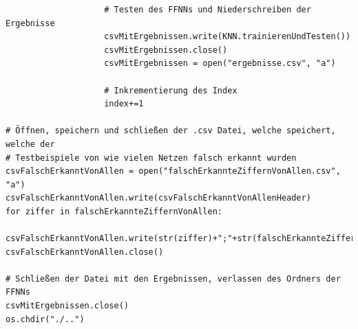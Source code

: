 \documentclass[a4paper,12pt,ngerman,oneside]{scrreprt}	%
\begin{document}
{\begin{lstlisting}
					# Testen des FFNNs und Niederschreiben der Ergebnisse
					csvMitErgebnissen.write(KNN.trainierenUndTesten())
					csvMitErgebnissen.close()
					csvMitErgebnissen = open("ergebnisse.csv", "a")
					
					# Inkrementierung des Index
					index+=1

# Öffnen, speichern und schließen der .csv Datei, welche speichert, welche der
# Testbeispiele von wie vielen Netzen falsch erkannt wurden
csvFalschErkanntVonAllen = open("falschErkannteZiffernVonAllen.csv", "a")
csvFalschErkanntVonAllen.write(csvFalschErkanntVonAllenHeader)
for ziffer in falschErkannteZiffernVonAllen:
	csvFalschErkanntVonAllen.write(str(ziffer)+";"+str(falschErkannteZiffernVonAllen[ziffer])+"\n")
csvFalschErkanntVonAllen.close()

# Schließen der Datei mit den Ergebnissen, verlassen des Ordners der FFNNs
csvMitErgebnissen.close()
os.chdir("./..")
				\end{lstlisting}
			}
		
		\newpage
\end{document}
